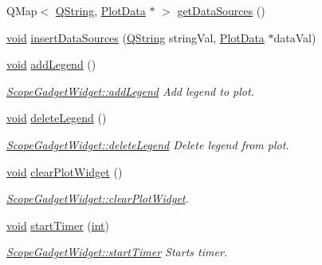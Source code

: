 \begin{DoxyCompactItemize}
\item 
Q\-Map$<$ \hyperlink{group___u_a_v_objects_plugin_gab9d252f49c333c94a72f97ce3105a32d}{Q\-String}, \hyperlink{class_plot_data}{Plot\-Data} $\ast$ $>$ \hyperlink{group__scopeplugin_gae23ab8c7b7852bc2ac59639923fb8cfc}{get\-Data\-Sources} ()
\item 
\hyperlink{group___u_a_v_objects_plugin_ga444cf2ff3f0ecbe028adce838d373f5c}{void} \hyperlink{group__scopeplugin_ga4682e74303bf7b117006e3d61a6827ce}{insert\-Data\-Sources} (\hyperlink{group___u_a_v_objects_plugin_gab9d252f49c333c94a72f97ce3105a32d}{Q\-String} string\-Val, \hyperlink{class_plot_data}{Plot\-Data} $\ast$data\-Val)
\item 
\hyperlink{group___u_a_v_objects_plugin_ga444cf2ff3f0ecbe028adce838d373f5c}{void} \hyperlink{group__scopeplugin_ga3f88f383dc322a2516c1e6b874e341a0}{add\-Legend} ()
\begin{DoxyCompactList}\small\item\em \hyperlink{group__scopeplugin_ga3f88f383dc322a2516c1e6b874e341a0}{Scope\-Gadget\-Widget\-::add\-Legend} Add legend to plot. \end{DoxyCompactList}\item 
\hyperlink{group___u_a_v_objects_plugin_ga444cf2ff3f0ecbe028adce838d373f5c}{void} \hyperlink{group__scopeplugin_ga16702effa3e6ad5ddf0f94a77e9c430a}{delete\-Legend} ()
\begin{DoxyCompactList}\small\item\em \hyperlink{group__scopeplugin_ga16702effa3e6ad5ddf0f94a77e9c430a}{Scope\-Gadget\-Widget\-::delete\-Legend} Delete legend from plot. \end{DoxyCompactList}\item 
\hyperlink{group___u_a_v_objects_plugin_ga444cf2ff3f0ecbe028adce838d373f5c}{void} \hyperlink{group__scopeplugin_ga9a19de9754adbab7df27b7db75348346}{clear\-Plot\-Widget} ()
\begin{DoxyCompactList}\small\item\em \hyperlink{group__scopeplugin_ga9a19de9754adbab7df27b7db75348346}{Scope\-Gadget\-Widget\-::clear\-Plot\-Widget}. \end{DoxyCompactList}\item 
\hyperlink{group___u_a_v_objects_plugin_ga444cf2ff3f0ecbe028adce838d373f5c}{void} \hyperlink{group__scopeplugin_gaf8b41e32e96d357706a0c2a04d63e40c}{start\-Timer} (\hyperlink{ioapi_8h_a787fa3cf048117ba7123753c1e74fcd6}{int})
\begin{DoxyCompactList}\small\item\em \hyperlink{group__scopeplugin_gaf8b41e32e96d357706a0c2a04d63e40c}{Scope\-Gadget\-Widget\-::start\-Timer} Starts timer. \end{DoxyCompactList}\end{DoxyCompactItemize}

